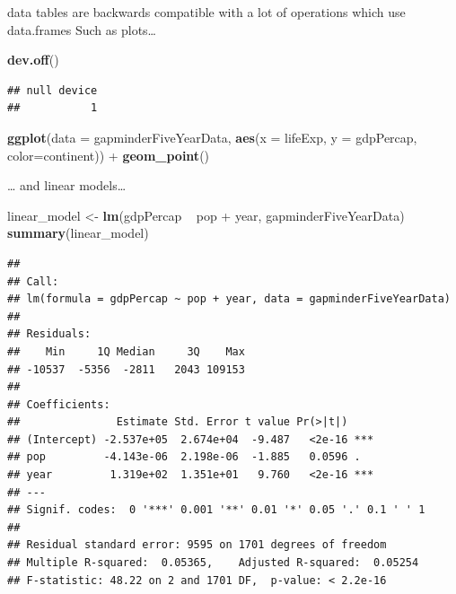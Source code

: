 \documentclass[]{article}
\newenvironment{Shaded}{\begin{snugshade}}{\end{snugshade}}
\newcommand{\KeywordTok}[1]{\textcolor[rgb]{0.13,0.29,0.53}{\textbf{{#1}}}}
\newcommand{\DataTypeTok}[1]{\textcolor[rgb]{0.13,0.29,0.53}{{#1}}}
\newcommand{\StringTok}[1]{\textcolor[rgb]{0.31,0.60,0.02}{{#1}}}
\newcommand{\NormalTok}[1]{{#1}}
\begin{document}
data tables are backwards compatible with a lot of operations which use
data.frames Such as plots\ldots{}

\begin{Shaded}
\begin{Highlighting}[]
\KeywordTok{dev.off}\NormalTok{()}
\end{Highlighting}
\end{Shaded}

\begin{verbatim}
## null device 
##           1
\end{verbatim}

\begin{Shaded}
\begin{Highlighting}[]
\KeywordTok{ggplot}\NormalTok{(}\DataTypeTok{data =} \NormalTok{gapminderFiveYearData, }\KeywordTok{aes}\NormalTok{(}\DataTypeTok{x =} \NormalTok{lifeExp, }\DataTypeTok{y =} \NormalTok{gdpPercap, }\DataTypeTok{color=}\NormalTok{continent)) +}
\StringTok{  }\KeywordTok{geom_point}\NormalTok{()}
\end{Highlighting}
\end{Shaded}

\ldots{} and linear models\ldots{}

\begin{Shaded}
\begin{Highlighting}[]
\NormalTok{linear_model <-}\StringTok{ }\KeywordTok{lm}\NormalTok{(gdpPercap ~}\StringTok{ }\NormalTok{pop +}\StringTok{ }\NormalTok{year, gapminderFiveYearData)}
\KeywordTok{summary}\NormalTok{(linear_model)}
\end{Highlighting}
\end{Shaded}

\begin{verbatim}
## 
## Call:
## lm(formula = gdpPercap ~ pop + year, data = gapminderFiveYearData)
## 
## Residuals:
##    Min     1Q Median     3Q    Max 
## -10537  -5356  -2811   2043 109153 
## 
## Coefficients:
##               Estimate Std. Error t value Pr(>|t|)    
## (Intercept) -2.537e+05  2.674e+04  -9.487   <2e-16 ***
## pop         -4.143e-06  2.198e-06  -1.885   0.0596 .  
## year         1.319e+02  1.351e+01   9.760   <2e-16 ***
## ---
## Signif. codes:  0 '***' 0.001 '**' 0.01 '*' 0.05 '.' 0.1 ' ' 1
## 
## Residual standard error: 9595 on 1701 degrees of freedom
## Multiple R-squared:  0.05365,    Adjusted R-squared:  0.05254 
## F-statistic: 48.22 on 2 and 1701 DF,  p-value: < 2.2e-16
\end{verbatim}
\end{document}
